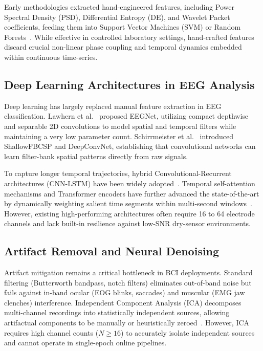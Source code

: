 \documentclass[conference]{IEEEtran}
\begin{document}
Early methodologies extracted hand-engineered features, including Power Spectral Density (PSD), Differential Entropy (DE), and Wavelet Packet coefficients, feeding them into Support Vector Machines (SVM) or Random Forests~\cite{duan2012differential, chai2016driver}. While effective in controlled laboratory settings, hand-crafted features discard crucial non-linear phase coupling and temporal dynamics embedded within continuous time-series.

\subsection{Deep Learning Architectures in EEG Analysis}
Deep learning has largely replaced manual feature extraction in EEG classification. Lawhern et al.~\cite{lawhern2018eegnet} proposed EEGNet, utilizing compact depthwise and separable 2D convolutions to model spatial and temporal filters while maintaining a very low parameter count. Schirrmeister et al.~\cite{schirrmeister2017deep} introduced ShallowFBCSP and DeepConvNet, establishing that convolutional networks can learn filter-bank spatial patterns directly from raw signals.

To capture longer temporal trajectories, hybrid Convolutional-Recurrent architectures (CNN-LSTM) have been widely adopted~\cite{li2022spatiotemporal}. Temporal self-attention mechanisms and Transformer encoders have further advanced the state-of-the-art by dynamically weighting salient time segments within multi-second windows~\cite{vaswani2017attention, song2022transformer}. However, existing high-performing architectures often require 16 to 64 electrode channels and lack built-in resilience against low-SNR dry-sensor environments.

\subsection{Artifact Removal and Neural Denoising}
Artifact mitigation remains a critical bottleneck in BCI deployments. Standard filtering (Butterworth bandpass, notch filters) eliminates out-of-band noise but fails against in-band ocular (EOG blinks, saccades) and muscular (EMG jaw clenches) interference. Independent Component Analysis (ICA) decomposes multi-channel recordings into statistically independent sources, allowing artifactual components to be manually or heuristically zeroed~\cite{zheng2017seedvig}. However, ICA requires high channel counts ($N \ge 16$) to accurately isolate independent sources and cannot operate in single-epoch online pipelines.
\end{document}

